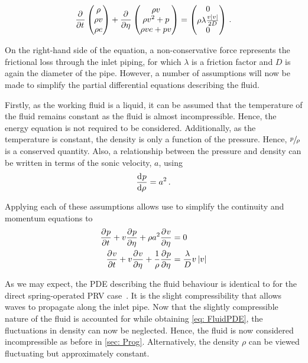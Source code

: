 \begin{equation*}
    \pdiff{}{t} \begin{pmatrix}
    \rho \\ \rho v \\ \rho e
    \end{pmatrix} +
    \pdiff{}{\eta} \begin{pmatrix}
    \rho v \\ \rho v^2 + p \\ \rho v e + p v
    \end{pmatrix} =
    \begin{pmatrix}
    0 \\ \rho \lambda \frac{v \left| v \right|}{2 D} \\ 0
    \end{pmatrix} \, .
\end{equation*}

On the right-hand side of the equation, a non-conservative force represents the frictional loss through the inlet piping, for which $\lambda$ is a friction factor and $D$ is again the diameter of the pipe. However, a number of assumptions will now be made to simplify the partial differential equations describing the fluid.

Firstly, as the working fluid is a liquid, it can be assumed that the temperature of the fluid remains constant as the fluid is almost incompressible. Hence, the energy equation is not required to be considered. Additionally, as the temperature is constant, the density is only a function of the pressure. Hence, $\sfrac{p}{\rho}$ is a conserved quantity. Also, a relationship between the pressure and density can be written in terms of the sonic velocity, $a$, using
~
\begin{equation*}
    \diff{p}{\rho} = a^2 \, .
\end{equation*}

Applying each of these assumptions allows use to simplify the continuity and momentum equations to
~
\begin{equation} \label{eq: FluidPDE}
\begin{split}
    \pdiff{p}{t} + v \pdiff{p}{\eta} + \rho a^2 \pdiff{v}{\eta} &= 0 \\
    \pdiff{v}{t} + v \pdiff{v}{\eta} + \frac{1}{\rho} \pdiff{p}{\eta} &=  \frac{\lambda}{D} v \left| v \right|
\end{split}
\end{equation}

As we may expect, the PDE describing the fluid behaviour is identical to for the direct spring-operated PRV case~\cite{Hos2015ModelPipe}. It is the slight compressibility that allows waves to propagate along the inlet pipe. Now that the slightly compressible nature of the fluid is accounted for while obtaining \cref{eq: FluidPDE}, the fluctuations in density can now be neglected. Hence, the fluid is now considered incompressible as before in \cref{sec: Prog}. Alternatively, the density $\rho$ can be viewed  fluctuating but approximately constant. %

